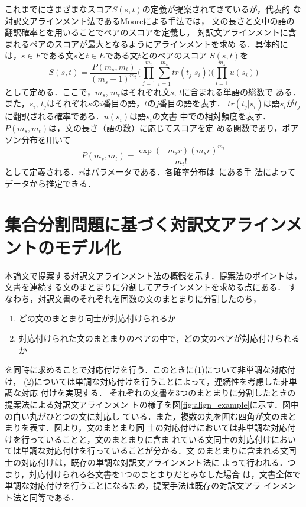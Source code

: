 \documentclass[japanese]{jnlp_1.4}
\begin{document}
これまでにさまざまなスコア$S(s, t)$の定義が提案されてきているが，代表的
な対訳文アラインメント法であるMooreによる手法\cite{moore02:_fast}では，
文の長さと文中の語の翻訳確率とを用いることでペアのスコアを定義し，
対訳文アラインメントに含まれるペアのスコアが最大となるようにアラインメントを求め
る．具体的には，$s \in F$である文$s$と$t \in E$である文$t$とのペアのスコア
$S(s, t)$を
\begin{equation}
 S(s, t) 
	= \frac{P(m_s, m_t)}{(m_s + 1)^{m_t}}\Biggl(\prod_{j=1}^{m_t}\sum_{i=1}^{m_s} tr(t_j|s_i)\Biggr)
	\Biggl(\prod_{i=1}^{m_s}u(s_i)\Biggr)
\label{eq:moore}
\end{equation}
として定める．ここで，$m_s$, $m_t$はそれぞれ文$s$, $t$に含まれる単語の総数で
ある．また，$s_i$, $t_j$はそれぞれ$s$の$i$番目の語，$t$の$j$番目の語を表す．
$tr(t_j|s_i)$は語$s_i$が$t_j$に翻訳される確率である．$u(s_i)$は語$s_i$の文書
中での相対頻度を表す．$P(m_s, m_t) $は，文の長さ（語の数）に応じてスコアを定
める関数であり，ポアソン分布を用いて
\begin{equation}
 P(m_s, m_t) = \frac{\exp{(-m_sr)}(m_sr)^{m_t}}{m_t!}
\end{equation}
として定義される．$r$はパラメータである．各確率分布は~\cite{brown93}にある手
法によってデータから推定できる．


\section{集合分割問題に基づく対訳文アラインメントのモデル化}
\label{sec:setpart}

本論文で提案する対訳文アラインメント法の概観を示す．提案法のポイントは，
文書を連続する文のまとまりに分割してアラインメントを求める点にある．
すなわち，対訳文書のそれぞれを同数の文のまとまりに分割したのち，
 \begin{enumerate}
  \item どの文のまとまり同士が対応付けられるか
  \item 対応付けられた文のまとまりのペアの中で，どの文のペアが対応付けられるか
 \end{enumerate}
を同時に求めることで対応付けを行う．このときに(1)について非単調な対応付け，
(2)については単調な対応付けを行うことによって，連続性を考慮した非単調な対応
付けを実現する．
それぞれの文書を3つのまとまりに分割したときの提案法による対訳文アラインメン
トの様子を図\ref{fig:align_example}に示す．図中の白い丸がひとつの文に対応し
ている．また，複数の丸を囲む四角が文のまとまりを表す．図より，文のまとまり同
士の対応付けにおいては非単調な対応付けを行っていることと，文のまとまりに含ま
れている文同士の対応付けにおいては単調な対応付けを行っていることが分かる．文
のまとまりに含まれる文同士の対応付けは，既存の単調な対訳文アラインメント法に
よって行われる．つまり，対応付けられる各文書を1つのまとまりだとみなした場合
は，文書全体で単調な対応付けを行うことになるため，提案手法は既存の対訳文アラ
インメント法と同等である．
\end{document}
